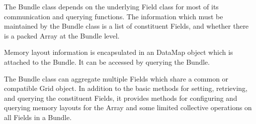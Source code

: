 


The Bundle class depends on the underlying Field class for most of its
communication and querying functions.  The information which
must be maintained by the Bundle class is a list of constituent
Fields, and whether there is a packed Array at the Bundle level.

Memory layout information is encapsulated in an DataMap object which
is attached to the Bundle.  It can be accessed by querying the Bundle.

The Bundle class can aggregate multiple Fields which share a
common or compatible Grid object.  In addition to the basic methods for
setting, retrieving, and querying the constituent Fields, it provides
methods for configuring and querying memory layouts for the Array
and some limited collective operations on all Fields in a Bundle.


